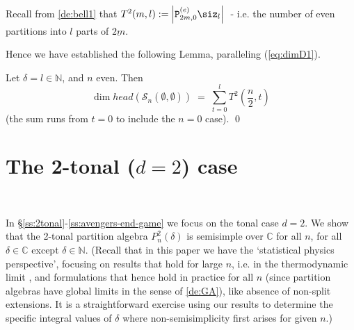 \documentclass[reqno,10pt,a4paper]{amsart}
\newcommand{\C}{\mathbb{C}}
\newcommand{\N}{\mathbb{N}}
\newcommand{\red}[1]{\textcolor{red}{#1}}
\newcommand{\ppm}[1]{\red{#1}}
\newcommand{\kn}{k}
\newcommand{\nk}{n}  %
\newcommand{\dl}{d}  %
\newcommand{\dell}{\dl}  %
\newcommand{\cell}{\mathcal{S}}
\newcommand{\T}{T^2}  %
\newcommand{\ignore}[1]{}
\newcommand{\rmP}{{\mathtt P}} %
\newcommand{\rmPe}{{\rmP}^{(e)}} %
\begin{document}

Recall 
from \ref{de:bell1} that 
$\T(m,l) := 
       \left|    %
             \rmPe_{2m,0}\siz_l \right|  \;$
- i.e. the number of even partitions into $l$ parts of $\underline{2m}$.



Hence we have established the following Lemma, paralleling (\ref{eq:dimD1}).

\begin{lem}\label{dimL}
Let $\delta =l \in\N$, 
and $n$ even. Then
$$
\dim head(\cell_\nk(\emptyset, \emptyset)) 
\; =  \;
\sum_{t=0}^{l} \T(\frac{\nk}{2}, t)
$$
{(the sum 
runs from $t=0$ to include the  %
$n=0$ case).}
\qed
\end{lem}

\ignore{{ 
\ppm{[DELETE:]}
NB: If $\delta =0$ then 
\ppm{formally??}
$\dim L(\emptyset, \emptyset) =0$. 
($P^2_\kn(\delta)$ is
cellular but not quasi-hereditary in this case. $L$ is defined to be
the cell module over its radical.
\ppm{[-this obviously does not work as written. but easy to fix.]})
}}







\section{The 2-tonal ($d=2$) case} $\;$ 
\label{ss:2tonal}


In \S\ref{ss:2tonal}-\ref{ss:avengers-end-game} 
we focus on the tonal case $\dell=2$. 
We show that the
2-tonal partition algebra 
$P^2_n(\delta)$ 
is semisimple over $\C$ 
for all $n$, 
for all $\delta\in\C$ 
except  %
$\delta \in \N$.
{(Recall that 
in this paper we have the `statistical physics perspective', focusing on results that hold for large $\nk$, i.e. in the thermodynamic limit \cite{Martin91},
and 
formulations that 
hence 
hold
in practice for all $n$ 
(since partition algebras have global limits
in the sense of \ref{de:GA}),
like absence of non-split extensions. 
It is a straightforward exercise using our results to determine the specific integral values of $\delta$ where non-semisimplicity first arises for given $n$.)}
\end{document}

